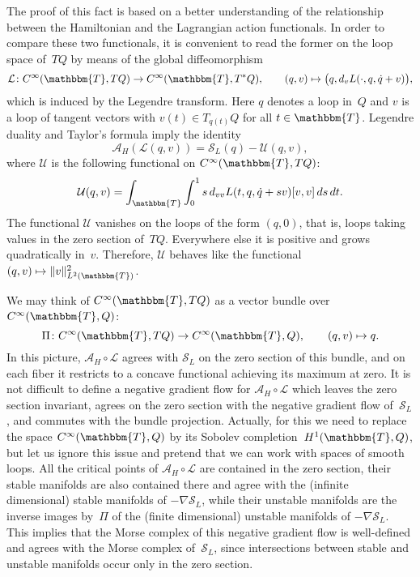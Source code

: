 \documentclass[12pt,twoside]{amsart}
\theoremstyle{plain}
\numberwithin{figure}{section}
\numberwithin{equation}{section}
\def\ca{{\mathcal A}}
\def\TT{\mathbbm{T}}
\begin{document}
The proof of this fact is based on a better understanding of the relationship between the Hamiltonian and the Lagrangian action functionals. In order to compare these two functionals, it is convenient to read the former on the loop space of~$TQ$ by means of the global diffeomorphism
\[
\mathcal{L} \colon C^{\infty}(\TT,TQ) \rightarrow C^{\infty}(\TT,T^*Q), \qquad (q,v) \mapsto \bigl(q,d_vL(\cdot,q,\dot q + v)\bigr),
\]
which is induced by the Legendre transform. Here $q$ denotes a loop in~$Q$ and $v$ is a loop of tangent vectors with $v(t) \in T_{q(t)} Q$ for all $t \in \TT$. Legendre duality and Taylor's formula imply the identity
\[
\ca_H(\mathcal{L}(q,v)) = \mathcal{S}_L(q) - \mathcal{U}(q,v),
\]
where $\mathcal{U}$ is the following functional on $C^{\infty}(\TT,TQ)$:
\[
\mathcal{U}(q,v) = \int_{\TT} \int_0^1 s\, d_{vv}L(t,q,\dot{q}+sv)[v,v]\, ds\, dt.
\]
The functional $\mathcal{U}$ vanishes on the loops of the form $(q,0)$, that is, 
loops taking values in the zero section of~$TQ$. Everywhere else it is positive and grows quadratically in~$v$. Therefore, $\mathcal{U}$ behaves like the functional 
$(q,v) \mapsto \|v\|^2_{L^2(\TT)}$. 


We may think of $C^{\infty}(\TT,TQ)$ as a vector bundle over $C^{\infty}(\TT,Q)$: 
\[
\Pi \colon C^{\infty}(\TT,TQ) \rightarrow C^{\infty}(\TT,Q), \qquad (q,v)\mapsto q.
\]
In this picture, $\ca_H \circ \mathcal{L}$ agrees with $\mathcal{S}_L$ on the zero section of this bundle, and on each fiber it restricts to a concave functional achieving its maximum at zero. 
It is not difficult to define a negative gradient flow for $\ca_H \circ \mathcal{L}$ which leaves the zero section invariant, agrees on the zero section with the negative gradient flow 
of~$\mathcal{S}_L$, and commutes with the bundle projection. Actually, for this we need to replace the space $C^{\infty}(\TT,Q)$ by its Sobolev completion~$H^1(\TT,Q)$, but let us ignore this issue and pretend that we can work with spaces of smooth loops. 
All the critical points of $\ca_H \circ \mathcal{L}$ are contained in the zero section, their stable manifolds are also contained there and agree with the (infinite dimensional) stable manifolds of $-\nabla \mathcal{S}_L$, while their unstable manifolds are the inverse images 
by~$\Pi$ of the (finite dimensional) unstable manifolds of $-\nabla \mathcal{S}_L$. 
This implies that the Morse complex of this negative gradient flow is 
well-defined and agrees with the Morse complex of~$\mathcal{S}_L$, since intersections between stable and unstable manifolds occur only in the zero section.
\end{document}
